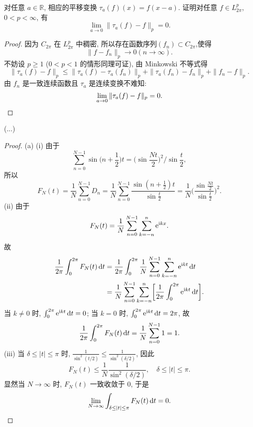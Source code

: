 \begin{exercise}[17]
  对任意 $a\in\mathbb{R}$, 相应的平移变换 $\tau_a(f)(x) = f(x-a)$.
  证明对任意 $f\in L_{2\pi}^p$, $0<p<\infty$, 有
  \[\lim_{a\to 0} \|\tau_a(f) - f\|_p = 0.\]
\end{exercise}

\begin{proof}
  因为 $C_{2\pi}$ 在 $L_{2\pi}^p$ 中稠密, 所以存在函数序列$(f_n)\subset C_{2\pi}$,使得
  \[\|f-f_n\|_p\to0(n\to\infty).\]
  不妨设 $p\geq 1$ ($0<p<1$ 的情形同理可证), 由 Minkowski 不等式得
  \[\|\tau_a(f)-f\|_p\leq\|\tau_a(f)-\tau_a(f_n)\|_p+\|\tau_a(f_n)-f_n\|_p+\|f_n-f\|_p.\]
  由 $f_n$ 是一致连续函数且 $\tau_a$ 是连续变换不难知:
  \[\lim_{a\to0}\|\tau_a(f)-f\|_p=0.\qedhere\]
\end{proof}


\begin{exercise}[18]
(...)
\end{exercise}

\begin{proof}
  (a) (i) 由于
  \[\sum_{n=0}^{N-1} \sin \biggl(n+\frac{1}{2}\biggr)t 
    = \biggl(\sin\frac{Nt}{2}\biggr)^2 \bigg/ \sin\frac{t}{2},\]
  所以
  \[F_N(t) = \frac{1}{N} \sum_{n=0}^{N-1} D_n
    = \frac{1}{N} \sum_{n=0}^{N-1} \frac{\sin (n+\frac{1}{2})t}{\sin\frac{t}{2}}
    = \frac{1}{N} \biggl(\frac{\sin\frac{Nt}{2}}{\sin\frac{t}{2}}\biggr)^2.\]
  (ii) 由于
  \[F_N(t) = \frac{1}{N} \sum_{n=0}^{N-1} \sum_{k=-n}^n \mathrm{e}^{\mathrm{i} kx}.\]
  故
  \begin{align*}
    \frac{1}{2\pi} \int_0^{2\pi} F_N(t) \mathop{}\!\mathrm{d} t
    & = \frac{1}{2\pi} \int_0^{2\pi} \frac{1}{N} \sum_{n=0}^{N-1}\sum_{k=-n}^n
        \mathrm{e}^{\mathrm{i} kt} \mathop{}\!\mathrm{d} t \\
    & = \frac{1}{N} \sum_{n=0}^{N-1}\sum_{k=-n}^n 
        \biggl[\frac{1}{2\pi} \int_0^{2\pi} \mathrm{e}^{\mathrm{i} kt} \mathop{}\!\mathrm{d} t\biggr].
  \end{align*}
  当 $k\neq 0$ 时, $\int_0^{2\pi} \mathrm{e}^{\mathrm{i} kt} \mathop{}\!\mathrm{d} t = 0$;
  当 $k = 0$ 时, $\int_0^{2\pi} \mathrm{e}^{\mathrm{i} kt} \mathop{}\!\mathrm{d} t = 2\pi$, 故
  \[\frac{1}{2\pi} \int_0^{2\pi} F_N(t) \mathop{}\!\mathrm{d} t
    = \frac{1}{N} \sum_{n=0}^{N-1} 1 = 1.\]
  (iii) 当 $\delta\leq |t| \leq\pi$ 时, $\frac{1}{\sin^2(t/2)} \leq \frac{1}{\sin^2(\delta/2)}$,
  因此
  \[F_N(t) \leq \frac{1}{N} \frac{1}{\sin^2(\delta/2)},\quad \delta\leq |t|\leq \pi.\]
  显然当 $N\to\infty$ 时, $F_N(t)$ 一致收敛于 $0$, 于是
  \[\lim_{N\to\infty} \int_{\delta\leq |t|\leq \pi} F_N(t) \mathop{}\!\mathrm{d} t = 0.\]
\end{proof}